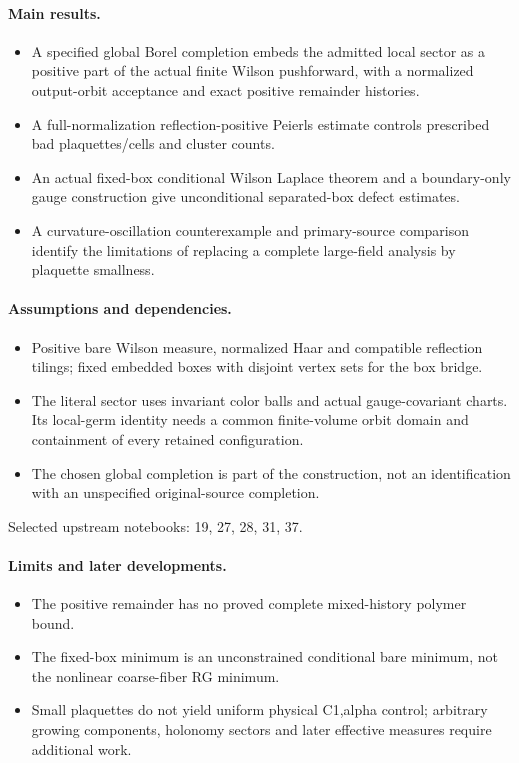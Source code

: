 \documentclass[11pt]{article}
\theoremstyle{remark}
\begin{document}
\paragraph{Main results.}
\begin{itemize}
\item A specified global Borel completion embeds the admitted local sector as a positive part of the actual finite Wilson pushforward, with a normalized output-orbit acceptance and exact positive remainder histories.
\item A full-normalization reflection-positive Peierls estimate controls prescribed bad plaquettes/cells and cluster counts.
\item An actual fixed-box conditional Wilson Laplace theorem and a boundary-only gauge construction give unconditional separated-box defect estimates.
\item A curvature-oscillation counterexample and primary-source comparison identify the limitations of replacing a complete large-field analysis by plaquette smallness.
\end{itemize}

\paragraph{Assumptions and dependencies.}
\begin{itemize}
\item Positive bare Wilson measure, normalized Haar and compatible reflection tilings; fixed embedded boxes with disjoint vertex sets for the box bridge.
\item The literal sector uses invariant color balls and actual gauge-covariant charts. Its local-germ identity needs a common finite-volume orbit domain and containment of every retained configuration.
\item The chosen global completion is part of the construction, not an identification with an unspecified original-source completion.
\end{itemize}

Selected upstream notebooks: 19, 27, 28, 31, 37.\par

\paragraph{Limits and later developments.}
\begin{itemize}
\item The positive remainder has no proved complete mixed-history polymer bound.
\item The fixed-box minimum is an unconstrained conditional bare minimum, not the nonlinear coarse-fiber RG minimum.
\item Small plaquettes do not yield uniform physical C1,alpha control; arbitrary growing components, holonomy sectors and later effective measures require additional work.
\end{itemize}
\end{document}
